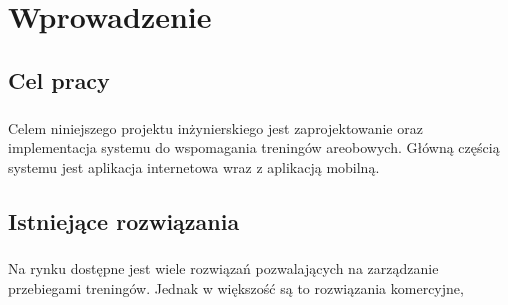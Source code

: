 \chapter{Wprowadzenie}

\section{Cel pracy}
\paragraph{}
Celem niniejszego projektu inżynierskiego jest zaprojektowanie oraz implementacja systemu do wspomagania treningów areobowych. Główną częścią systemu jest aplikacja internetowa wraz z aplikacją mobilną.



\section{Istniejące rozwiązania}
\paragraph{}
Na rynku dostępne jest wiele rozwiązań pozwalających na zarządzanie przebiegami treningów. Jednak w większość są to rozwiązania komercyjne, 

